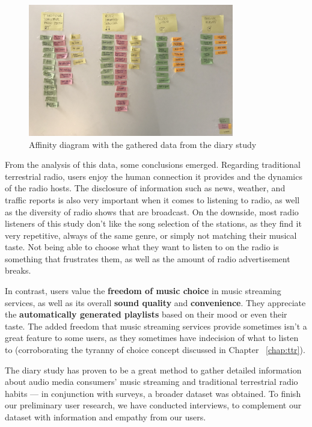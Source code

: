 \begin{figure}[h]
\centering
\includegraphics[width=0.8\textwidth]{./Images/affinitydiagram.jpg}
\caption{Affinity diagram with the gathered data from the diary study}
\label{fig:diagram1}
\end{figure}


From the analysis of this data, some conclusions emerged. Regarding traditional terrestrial radio, users enjoy the human connection it provides and the dynamics of the radio hosts. The disclosure of information such as news, weather, and traffic reports is also very important when it comes to listening to radio, as well as the diversity of radio shows that are broadcast. On the downside, most radio listeners of this study don't like the song selection of the stations, as they find it very repetitive, always of the same genre, or simply not matching their musical taste. Not being able to choose what they want to listen to on the radio is something that frustrates them, as well as the amount of radio advertisement breaks.

In contrast, users value the \textbf{freedom of music choice} in music streaming services, as well as its overall \textbf{sound quality} and \textbf{convenience}. They appreciate the \textbf{automatically generated playlists} based on their mood or even their taste. The added freedom that music streaming services provide sometimes isn't a great feature to some users, as they sometimes have indecision of what to listen to (corroborating the tyranny of choice concept discussed in Chapter ~\ref{chap:ttr}). 

The diary study has proven to be a great method to gather detailed information about audio media consumers' music streaming and traditional terrestrial radio habits — in conjunction with surveys, a broader dataset was obtained. To finish our preliminary user research, we have conducted interviews, to complement our dataset with information and empathy from our users.

